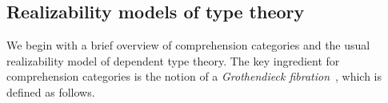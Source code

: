 \documentclass[a4paper,UKenglish,cleveref,numberwithinsect, autoref, thm-restate]{lipics-v2021}
\begin{document}



\subsection{Realizability models of type theory}
We begin with a brief overview of comprehension categories
and the usual realizability model of dependent type theory.
The key ingredient for comprehension categories is the notion of a \emph{Grothendieck fibration}~\cite{grothendieck:1960},
which is defined as follows.
\end{document}
